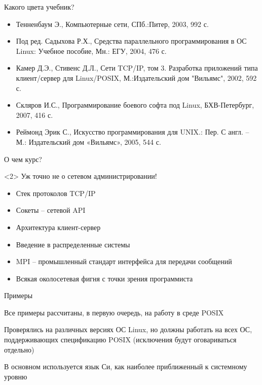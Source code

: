 \documentclass[ignorenonframetext, hyperref={pdftex, unicode}]{beamer}
\begin{document}
\begin{frame}{Какого цвета учебник?}
	\begin{itemize}
		\item Тенненбаум Э.,  Компьютерные сети,  СПб.:Питер,  2003,  992 с.
		\item Под ред. Садыхова Р.Х.,  Средства параллельного программирования в ОС Linux: Учебное пособие,  Мн.: ЕГУ,  2004,  476 с.
		\item Камер Д.Э.,  Стивенс Д.Л.,  Сети TCP/IP,  том 3. Разработка приложений типа клиент/сервер для Linux/POSIX,  М.:Издательский дом "Вильямс",  2002,  592 с.
		\item Скляров И.С.,  Программирование боевого софта под Linux,  БХВ-Петербург,  2007,  416 с.
		\item Реймонд Эрик С.,  Искусство программирования для UNIX.: Пер. С англ. – М.: Издательский дом «Вильямс»,  2005,  544 с.
	\end{itemize}
\end{frame}



\begin{frame}{О чем курс?}
	\pause
	\begin{block}{}<2>
Уж точно не о сетевом администрировании!
	\end{block}
	\pause
	\begin{itemize}
		\item Стек протоколов TCP/IP
			\pause
		\item Сокеты -- сетевой API
			\pause
		\item Архитектура клиент-сервер
			\pause
		\item Введение в распределенные системы
			\pause
		\item MPI -- промышленный стандарт интерфейса для передачи сообщений
			\pause
		\item Всякая околосетевая фигня с точки зрения программиста
	\end{itemize}
\end{frame}

\begin{frame}{Примеры}
\begin{center}
	Все примеры рассчитаны, в первую очередь, на работу в среде POSIX
\par
	Проверялись на различных версиях ОС Linux, но должны работать на всех ОС, поддерживающих спецификацию POSIX (исключения будут оговариваться отдельно)
\par	
	В основном используется язык Си, как наиболее приближенный к системному уровню
\end{center}
\end{frame}
\end{document}
